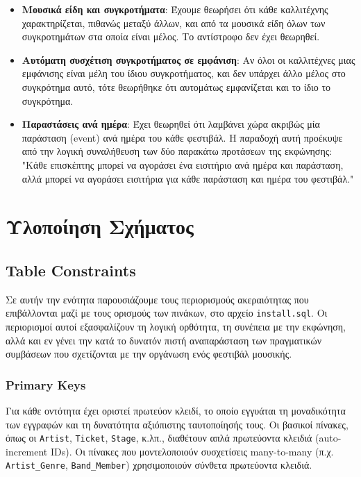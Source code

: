 \documentclass[13pt]{extarticle}
\begin{document}
\begin{itemize}
    \item \textbf{Μουσικά είδη και συγκροτήματα}: Έχουμε θεωρήσει ότι κάθε καλλιτέχνης χαρακτηρίζεται, πιθανώς μεταξύ άλλων, και από τα μουσικά είδη όλων των συγκροτημάτων στα οποία είναι μέλος. Το αντίστροφο δεν έχει θεωρηθεί.
    
    \item \textbf{Αυτόματη συσχέτιση συγκροτήματος σε εμφάνιση}: Αν όλοι οι καλλιτέχνες μιας εμφάνισης είναι μέλη του ίδιου συγκροτήματος, και δεν υπάρχει άλλο μέλος στο συγκρότημα αυτό, τότε θεωρήθηκε ότι αυτομάτως εμφανίζεται και το ίδιο το συγκρότημα.

    \item \textbf{Παραστάσεις ανά ημέρα}: Έχει θεωρηθεί ότι λαμβάνει χώρα ακριβώς μία παράσταση (event) ανά ημέρα του κάθε φεστιβάλ. Η παραδοχή αυτή προέκυψε από την λογική συναλήθευση των δύο παρακάτω προτάσεων της εκφώνησης: "Κάθε επισκέπτης μπορεί να αγοράσει ένα εισιτήριο ανά ημέρα και παράσταση, αλλά μπορεί να αγοράσει εισιτήρια για κάθε παράσταση και ημέρα του φεστιβάλ."
\end{itemize}


\clearpage
\section{Υλοποίηση Σχήματος}
\subsection{Table Constraints}

Σε αυτήν την ενότητα παρουσιάζουμε τους περιορισμούς ακεραιότητας που επιβάλλονται μαζί με τους ορισμούς των πινάκων, στο αρχείο \texttt{install.sql}. Οι περιορισμοί αυτοί εξασφαλίζουν τη λογική ορθότητα, τη συνέπεια με την εκφώνηση, αλλά και εν γένει την κατά το δυνατόν πιστή αναπαράσταση των πραγματικών συμβάσεων που σχετίζονται με την οργάνωση ενός φεστιβάλ μουσικής.

\subsubsection{Primary Keys}

Για κάθε οντότητα έχει οριστεί πρωτεύον κλειδί, το οποίο εγγυάται τη μοναδικότητα των εγγραφών και τη δυνατότητα αξιόπιστης ταυτοποίησής τους. Οι βασικοί πίνακες, όπως οι \texttt{Artist}, \texttt{Ticket}, \texttt{Stage}, κ.λπ., διαθέτουν απλά πρωτεύοντα κλειδιά (auto-increment IDs). Οι πίνακες που μοντελοποιούν συσχετίσεις many-to-many (π.χ. \texttt{Artist\_Genre}, \texttt{Band\_Member}) χρησιμοποιούν σύνθετα πρωτεύοντα κλειδιά.
\end{document}
